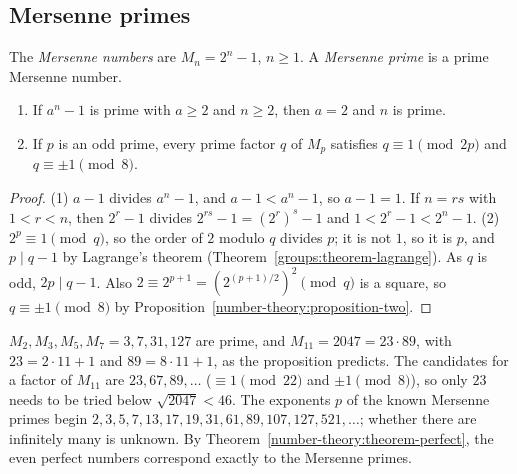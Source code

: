 \subsection{Mersenne primes}\label{prime-numbers:subsection-mersenne}

\begin{definition}\label{prime-numbers:definition-mersenne}
The \emph{Mersenne numbers} are $M_n = 2^n - 1$, $n \geq 1$. A \emph{Mersenne prime} is a prime Mersenne number.
\end{definition}

\begin{proposition}\label{prime-numbers:proposition-mersenne-basic}
\begin{enumerate}
\item If $a^n - 1$ is prime with $a \geq 2$ and $n \geq 2$, then $a = 2$ and $n$ is prime.
\item If $p$ is an odd prime, every prime factor $q$ of $M_p$ satisfies $q \equiv 1 \pmod{2p}$ and $q \equiv \pm 1 \pmod 8$.
\end{enumerate}
\end{proposition}

\begin{proof}
(1) $a - 1$ divides $a^n - 1$, and $a - 1 < a^n - 1$, so $a - 1 = 1$. If $n = rs$ with $1 < r < n$, then $2^r - 1$ divides $2^{rs} - 1 = (2^r)^s - 1$ and $1 < 2^r - 1 < 2^n - 1$.
(2) $2^p \equiv 1 \pmod q$, so the order of $2$ modulo $q$ divides $p$; it is not $1$, so it is $p$, and $p \mid q - 1$ by Lagrange's theorem (Theorem~\ref{groups:theorem-lagrange}). As $q$ is odd,
$2p \mid q - 1$. Also $2 \equiv 2^{p+1} = (2^{(p+1)/2})^2 \pmod q$ is a square, so $q \equiv \pm 1 \pmod 8$ by Proposition~\ref{number-theory:proposition-two}.
\end{proof}

\begin{example}\label{prime-numbers:example-mersenne}
$M_2, M_3, M_5, M_7 = 3, 7, 31, 127$ are prime, and $M_{11} = 2047 = 23 \cdot 89$, with $23 = 2 \cdot 11 + 1$ and $89 = 8 \cdot 11 + 1$, as the proposition predicts. The candidates for a factor of
$M_{11}$ are $23, 67, 89, \ldots$ ($\equiv 1 \pmod{22}$ and $\pm 1 \pmod 8$), so only $23$ needs to be tried below $\sqrt{2047} < 46$. The exponents $p$ of the known Mersenne primes begin
$2, 3, 5, 7, 13, 17, 19, 31, 61, 89, 107, 127, 521, \ldots$; whether there are infinitely many is unknown. By Theorem~\ref{number-theory:theorem-perfect}, the even perfect numbers correspond
exactly to the Mersenne primes.
\end{example}

